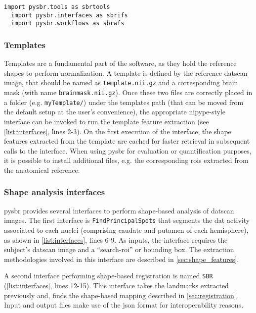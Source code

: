 \documentclass{frontiers}
\begin{document}
  \begin{lstlisting}[float,numbers=none,caption={\label{list:modules}
            Loading the three major elements of the python interface of PySBR}]
  import pysbr.tools as sbrtools
  import pysbr.interfaces as sbrifs
  import pysbr.workflows as sbrwfs
  \end{lstlisting}

\subsubsection{Templates}
\label{sec:templates}
Templates are a fundamental part of the software, as they hold the reference shapes to
  perform normalization.
A template is defined by the reference \gls*{datscan} image, that
  should be named as \texttt{template.nii.gz} and a corresponding brain mask (with name
  \texttt{brainmask.nii.gz}).
Once these two files are correctly placed in a folder
  (e.g. \texttt{myTemplate/}) under the templates path (that can be moved from the
  default setup at the user's convenience), the appropriate \gls*{nipype}-style
  interface can be invoked to run the template feature extraction (see
  \autoref{list:interfaces}, lines 2-3).
On the first execution of the interface, the shape features extracted from
  the template are cached for faster retrieval in subsequent calls to the interface. 
When using \gls*{pysbr} for evaluation or quantification purposes, it is possible
  to install additional files, e.g. the corresponding \glspl*{roi} extracted
  from the anatomical reference.


\subsubsection{Shape analysis interfaces}
\label{sec:shapeanalysis}

\Gls*{pysbr} provides several interfaces to perform shape-based analysis of \gls*{datscan}
  images.
The first interface is \texttt{FindPrincipalSpots} that segments the \acrlong*{dat} activity
  associated to each nuclei (comprising caudate and putamen of each hemisphere),
  as shown in \autoref{list:interfaces}, lines 6-9.
As inputs, the interface requires the subject's \gls*{datscan} image and a ``search-\gls*{roi}'' or
  bounding box.
The extraction methodologies involved in this interface are described in \autoref{sec:shape_features}.

A second interface performing shape-based registration is named \texttt{SBR}
  (\autoref{list:interfaces}, lines 12-15).
This interface takes the landmarks extracted previously and, finds
  the shape-based mapping described in \autoref{sec:registration}.
Input and output files make use of the \gls*{json} format
  for interoperability reasons.
\end{document}
